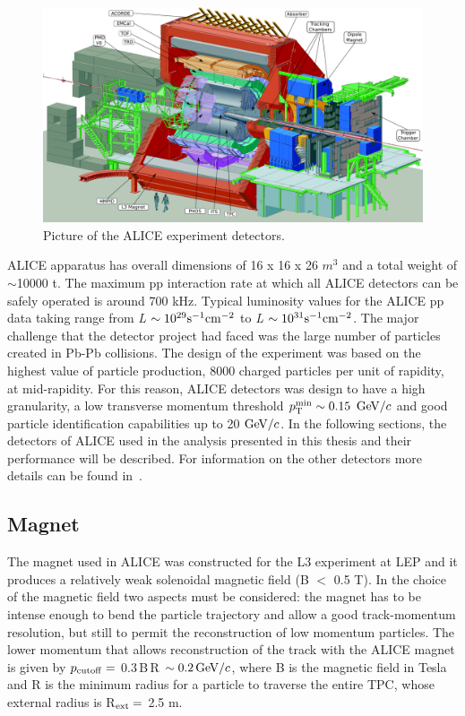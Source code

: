 \begin{figure}[!t]
\centering
\includegraphics[width=12cm]{FigCap3/alice.png}
\caption{Picture of the ALICE experiment detectors.}
\label{fig:imageALICE}
\end{figure}
ALICE apparatus has overall dimensions of 16 x 16 x 26 $m^3$ and a total 
weight of $\sim$10000 t. The maximum pp interaction rate at which all ALICE 
detectors can be safely operated is around 700 kHz. Typical luminosity values 
for the ALICE pp data taking range from \textit{L} $\sim 10^{29}{\rm s}^{-1}{\rm cm}^{-2}$ 
to \textit{L} $\sim 10^{31}{\rm s}^{-1}{\rm cm}^{-2}$.
The major challenge that the detector project had faced was the large number of 
particles created in Pb-Pb collisions. The design of the experiment was based 
on the highest value of particle production, 8000 charged particles per unit of 
rapidity, at mid-rapidity. For this reason, ALICE detectors was design to have a 
high granularity, a low transverse momentum threshold $p_{\rm T}^{\rm min} \sim 0.15 $ 
$\mathrm{GeV}/c$ and good particle identification capabilities up to 20 $\mathrm{GeV}/c$.
In the following sections, the detectors of ALICE used in the analysis presented in this thesis and their 
performance will be described. For information on the other detectors more details can be found in~\cite{Aamodt:2008zz}.

\subsection{Magnet}
The magnet used in ALICE was constructed for the L3 experiment at LEP and 
it produces a relatively weak solenoidal magnetic field (B $<$ 0.5 T). In the choice 
of the magnetic field two aspects must be considered: the magnet has to be intense 
enough to bend the particle trajectory and allow a good track-momentum resolution, 
but still to permit the reconstruction of low 
momentum particles. The lower momentum that allows reconstruction of the track 
with the ALICE magnet is given by $p_{\rm cutoff}=$ 0.3$\,$B$\,$R $\sim 0.2\,\mathrm{GeV}/c$, 
where B is the magnetic field in Tesla and R is the minimum radius for a particle to 
traverse the entire TPC, whose external radius is R$_{\rm ext}=$ 2.5 m.

